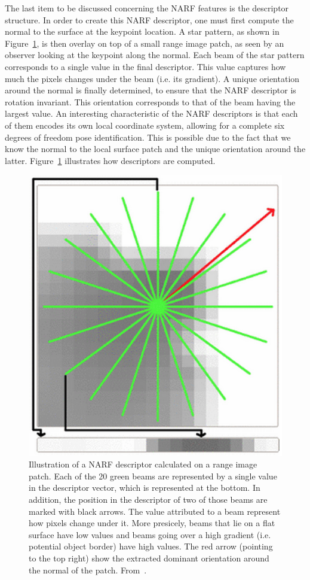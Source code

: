 The last item to be discussed concerning the NARF features is the descriptor structure. In order to create this NARF descriptor, one must first compute the normal to the surface at the keypoint location. A star pattern, as shown in Figure~\ref{fig:narf_descriptor}, is then overlay on top of a small range image patch, as seen by an observer looking at the keypoint along the normal. Each beam of the star pattern corresponds to a single value in the final descriptor. This value captures how much the pixels changes under the beam (i.e. its gradient). A unique orientation around the normal is finally determined, to ensure that the NARF descriptor is rotation invariant. This orientation corresponds to that of the beam having the largest value. An interesting characteristic of the NARF descriptors is that each of them encodes its own local coordinate system, allowing for a complete six degrees of freedom pose identification. This is possible due to the fact that we know the normal to the local surface patch and the unique orientation around the latter. Figure~\ref{fig:narf_descriptor} illustrates how descriptors are computed.

\begin{figure}[H]
    \centering
    \includegraphics[width=0.4\linewidth]{img/chap_slam/narf.png}
    \caption[Illustration of a NARF descriptor calculated on a range image patch.]{Illustration of a NARF descriptor calculated on a range image patch. Each of the 20 green beams are represented by a single value in the descriptor vector, which is represented at the bottom. In addition, the position in the descriptor of two of those beams are marked with black arrows. The value attributed to a beam represent how pixels change under it. More presicely, beams that lie on a flat surface have low values and beams going over a high gradient (i.e. potential object border) have high values. The red arrow (pointing to the top right) show the extracted dominant orientation around the normal of the patch. From~\cite{Steder2011a}.}
    \label{fig:narf_descriptor}
\end{figure}


